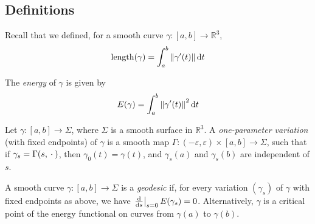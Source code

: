 \subsection{Definitions}
Recall that we defined, for a smooth curve \( \gamma \colon [a,b] \to \mathbb R^3 \),
\[
	\mathrm{length}(\gamma) = \int_a^b \norm{\gamma'(t)} \dd{t}
\]
\begin{definition}
	The \textit{energy} of \( \gamma \) is given by
	\[
		E(\gamma) = \int_a^b \norm{\gamma'(t)}^2 \dd{t}
	\]
\end{definition}
\begin{definition}
	Let \( \gamma \colon [a,b] \to \Sigma \), where \( \Sigma \) is a smooth surface in \( \mathbb R^3 \).
	A \textit{one-parameter variation} (with fixed endpoints) of \( \gamma \) is a smooth map \( \Gamma \colon (-\varepsilon, \varepsilon) \times [a,b] \to \Sigma \), such that if \( \gamma_s = \Gamma(s,{}\cdot{}) \), then
	\( \gamma_0(t) = \gamma(t) \), and \( \gamma_s(a) \) and \( \gamma_s(b) \) are independent of \( s \).
\end{definition}
\begin{definition}
	A smooth curve \( \gamma \colon [a,b] \to \Sigma \) is a \textit{geodesic} if, for every variation \( (\gamma_s) \) of \( \gamma \) with fixed endpoints as above, we have \( \eval{\dv{s}}_{s=0} E(\gamma_s) = 0 \).
	Alternatively, \( \gamma \) is a critical point of the energy functional on curves from \( \gamma(a) \) to \( \gamma(b) \).
\end{definition}

